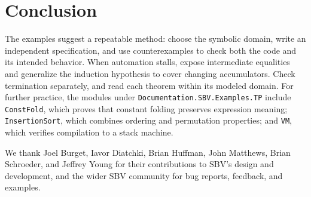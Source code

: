\documentclass[acmsmall,screen,review,anonymous,nonacm]{acmart}
\newcommand{\code}[1]{\texttt{#1}}
\begin{document}
\section{Conclusion}

The examples suggest a repeatable method: choose the symbolic domain, write an
independent specification, and use counterexamples to check both the code and
its intended behavior. When automation stalls, expose intermediate equalities
and generalize the induction hypothesis to cover changing accumulators.
Check termination separately, and read each theorem within its modeled domain.
For further practice, the modules under
\code{Documentation.\allowbreak SBV.\allowbreak Examples.\allowbreak TP}
include \code{ConstFold}, which proves that constant folding preserves
expression meaning; \code{InsertionSort}, which combines ordering and permutation
properties; and \code{VM}, which verifies compilation to a stack machine.

\begin{acks}
We thank Joel Burget, Iavor Diatchki, Brian Huffman, John Matthews, Brian Schroeder,
and Jeffrey Young for their contributions to SBV's design and development, and
the wider SBV community for bug reports, feedback, and examples.
\end{acks}



\end{document}
